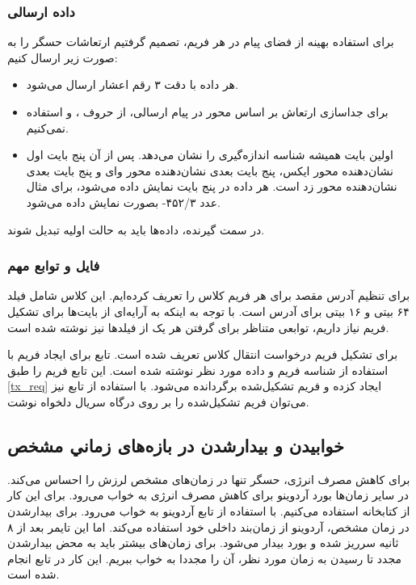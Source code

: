 \subsubsection{داده ارسالی}

برای استفاده بهینه از فضای پیام در هر فریم، تصمیم گرفتیم ارتعاشات حسگر را به صورت زیر ارسال کنیم:

\begin{itemize}
\item هر داده با دقت ۳ رقم اعشار ارسال می‌شود.
\item برای جداسازی ارتعاش بر اساس محور در پیام ارسالی، از حروف ،  و  استفاده نمی‌کنیم.
\item اولین بایت همیشه شناسه اندازه‌گیری را نشان می‌دهد. پس از آن پنج بایت اول نشان‌دهنده محور ایکس، پنج بایت بعدی نشان‌دهنده محور وای و پنج بایت بعدی نشان‌دهنده محور زد است. هر داده در پنج بایت نمایش داده می‌شود، برای مثال عدد ۴۵۲/۳- بصورت  نمایش داده می‌شود.
\end{itemize}

در سمت گیرنده، داده‌ها باید به حالت اولیه تبدیل شوند.

\subsubsection{فایل  و توابع مهم}

برای تنظیم آدرس مقصد برای هر فریم کلاس  را تعریف کرده‌ایم. این کلاس شامل فیلد ۶۴ بیتی و ۱۶ بیتی برای آدرس است. با توجه به اینکه به آرایه‌ای از بایت‌ها برای تشکیل فریم نیاز داریم، توابعی متناظر برای گرفتن هر یک از فیلدها نیز نوشته شده است.


برای تشکیل فریم درخواست انتقال کلاس  تعریف شده است. تابع  برای ایجاد فریم با استفاده از شناسه فریم و داده مورد نظر نوشته شده است. این تابع فریم را طبق \cref{tx_req} ایجاد کزده و فریم تشکیل‌شده برگردانده می‌شود. با استفاده از تابع  نیز می‌توان فریم تشکیل‌شده را بر روی درگاه سریال دلخواه نوشت.

\subsection{‫ﺧﻮﺍﺑﻴﺪﻥ‬ ‫ﻭ‬ ‫ﺑﻴﺪﺍﺭﺷﺪﻥ‬ ‫ﺩﺭ‬ ‫ﺑﺎﺯﻩ‬‌‫ﻫﺎی ‬‫ﺯﻣﺎﻧﻲ‬ ‫ﻣﺸﺨﺺ‬}

برای کاهش مصرف انرژی، حسگر تنها در زمان‌های مشخص لرزش را احساس می‌کند. در سایر زمان‌ها بورد آردوینو برای کاهش مصرف انرژی به خواب می‌رود. برای این کار از کتابخانه  استفاده می‌کنیم. با استفاده از تابع  آردوینو به خواب می‌رود. برای بیدارشدن در زمان مشخص، آردوینو از زمان‌بند داخلی خود استفاده می‌کند. اما این تایمر بعد از ۸ ثانیه سرریز شده و بورد بیدار می‌شود. برای زمان‌های بیشتر باید به محض بیدارشدن مجدد تا رسیدن به زمان مورد نظر، آن را مجددا به خواب ببریم. این کار در تابع  انجام شده است.

